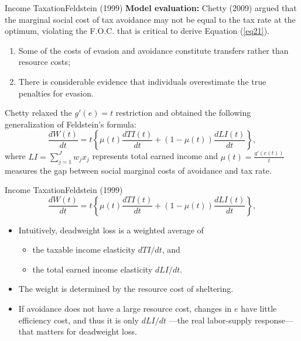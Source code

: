 \documentclass{beamer}
\begin{document}
\begin{frame}{Income Taxation}{Feldstein (1999)}
	\textbf{Model evaluation:} Chetty (2009) argued that the marginal social cost of tax avoidance may not be equal to the tax rate at the optimum, violating the F.O.C. that is critical to derive Equation (\ref{eq21}).
	\begin{enumerate}
		\item Some of the costs of evasion and avoidance constitute transfers rather than resource costs;
		\item There is considerable evidence that individuals overestimate the true penalties for evasion.
	\end{enumerate}
	Chetty relaxed the $g'(e)=t$ restriction and obtained the following generalization of Feldstein’s formula:
	\begin{equation}
		\frac{dW(t)}{dt} = t\left\{\mu(t)\frac{dTI(t)}{dt}+(1-\mu(t))\frac{dLI(t)}{dt}\right\},
	\end{equation}
	where $LI=\sum_{j=1}^Jw_jx_j$ represents total earned income and $\mu(t)=\frac{g'(e(t))}{t}$ measures the gap between social marginal costs of avoidance and tax rate.
\end{frame}
\begin{frame}{Income Taxation}{Feldstein (1999)}
	\begin{equation}\nonumber
		\frac{dW(t)}{dt} = t\left\{\mu(t)\frac{dTI(t)}{dt}+(1-\mu(t))\frac{dLI(t)}{dt}\right\},
	\end{equation}
	\begin{itemize}
		\item Intuitively, deadweight loss is a weighted average of
		\begin{itemize}
			\item the taxable income elasticity $dTI/dt$, and
			\item the total earned income elasticity $dLI/dt$.
		\end{itemize}
		\item The weight is determined by the resource cost of sheltering.
		\item If avoidance does not have a large resource cost, changes in $e$ have little efficiency cost, and thus it is only $dLI/dt$ —the real labor-supply response—that matters for deadweight loss.
	\end{itemize}
\end{frame}
\end{document}
